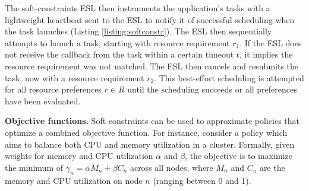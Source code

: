 The soft-constraints ESL then instruments the application's tasks with a lightweight heartbeat sent to the ESL to notify it of successful scheduling when the task launches (Listing \ref{listing:softconstr}).
The ESL then sequentially attempts to launch a task, starting with resource requirement $r_1$. If the ESL does not receive the callback from the task within a certain timeout $t$, it implies the resource requirement was not matched.
The ESL then cancels and resubmits the task, now with a resource requirement $r_2$. This best-effort scheduling is attempted for all resource preferences $r \in R$ until the scheduling succeeds or all preferences have been evaluated.






% 

\label{policies:objective}
\textbf{Objective functions.}
Soft constraints can be used to approximate policies that optimize a combined objective function.
For instance, consider a policy which aims to balance both CPU and memory utilization in a cluster.
Formally, given weights for memory and CPU utilization $\alpha$ and $\beta$, the objective is to maximize the minimum of $\gamma_n=\alpha M_n + \beta C_n$ across all nodes, where $M_n$ and $C_n$ are the memory and CPU utilization on node $n$ (ranging between 0 and 1).

